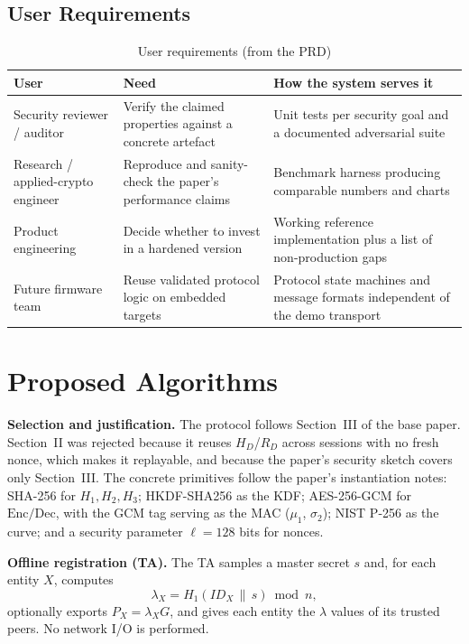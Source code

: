 \documentclass[12pt,a4paper,oneside]{report}
\numberwithin{equation}{chapter}
\begin{document}
\subsection{User Requirements}
\begin{table}[H]
\centering
\caption{User requirements (from the PRD)}
\label{tab:ur}
\small
\begin{tabularx}{\textwidth}{|P{0.22\textwidth}|Y|Y|}
\hline
\textbf{User} & \textbf{Need} & \textbf{How the system serves it}\\ \hline
Security reviewer / auditor & Verify the claimed properties against a concrete artefact & Unit tests per security goal and a documented adversarial suite\\ \hline
Research / applied-crypto engineer & Reproduce and sanity-check the paper's performance claims & Benchmark harness producing comparable numbers and charts\\ \hline
Product engineering & Decide whether to invest in a hardened version & Working reference implementation plus a list of non-production gaps\\ \hline
Future firmware team & Reuse validated protocol logic on embedded targets & Protocol state machines and message formats independent of the demo transport\\ \hline
\end{tabularx}
\end{table}

\section{Proposed Algorithms}
\textbf{Selection and justification.} The protocol follows Section~III of the base paper. Section~II was rejected because it reuses $H_D$/$R_D$ across sessions with no fresh nonce, which makes it replayable, and because the paper's security sketch covers only Section~III. The concrete primitives follow the paper's instantiation notes: SHA-256 for $H_1,H_2,H_3$; HKDF-SHA256 \cite{rfc5869} as the KDF; AES-256-GCM \cite{nist80038d} for $\mathrm{Enc}/\mathrm{Dec}$, with the GCM tag serving as the MAC ($\mu_1$, $\sigma_2$); NIST P-256 as the curve; and a security parameter $\ell=128$ bits for nonces.

\textbf{Offline registration (TA).} The TA samples a master secret $s$ and, for each entity $X$, computes
\begin{equation}
\lambda_X = H_1(ID_X \,\|\, s) \bmod n,
\end{equation}
optionally exports $P_X=\lambda_X G$, and gives each entity the $\lambda$ values of its trusted peers. No network I/O is performed.
\end{document}
